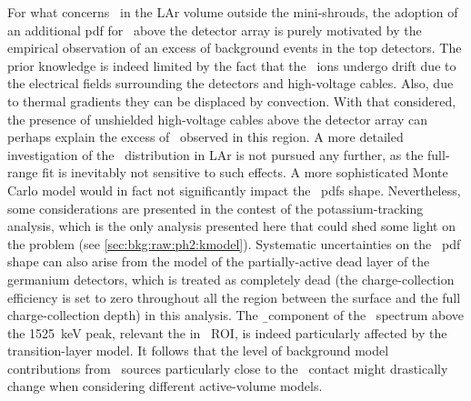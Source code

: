 \blocktitle{\kvz}
For what concerns \kvz\ in the LAr volume outside the mini-shrouds, the adoption of an
additional pdf for \kvz\ above the detector array is purely motivated by the empirical
observation of an excess of background events in the top detectors. The prior knowledge is
indeed limited by the fact that the \kvz\ ions undergo drift due to the electrical fields
surrounding the detectors and high-voltage cables. Also, due to thermal gradients they can
be displaced by convection. With that considered, the presence of unshielded high-voltage
cables above the detector array can perhaps explain the excess of \kvz\ observed in this
region. A more detailed investigation of the \kvz\ distribution in LAr is not pursued any
further, as the full-range fit is inevitably not sensitive to such effects. A more
sophisticated Monte Carlo model would in fact not significantly impact the \kvz\ pdfs
shape. Nevertheless, some considerations are presented in the contest of the
potassium-tracking analysis, which is the only analysis presented here that could shed
some light on the problem (see \cref{sec:bkg:raw:ph2:kmodel}). Systematic uncertainties on
the \kvz\ pdf shape can also arise from the model of the partially-active dead layer of
the germanium detectors, which is treated as completely dead (the charge-collection
efficiency is set to zero throughout all the region between the surface and the full
charge-collection depth) in this analysis. The \b\ component of the \kvz\ spectrum above
the 1525~keV peak, relevant the in \onbb\ ROI, is indeed particularly affected by the
transition-layer model. It follows that the level of background model contributions from
\kvz\ sources particularly close to the \nplus\ contact might drastically change when
considering different active-volume models.

